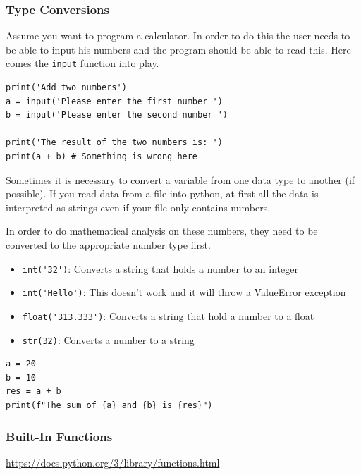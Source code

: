 \documentclass[10pt, a4paper]{beamer} %
\begin{document}
\begin{frame}
  \frametitle{Type Conversions}

  Assume you want to program a calculator.
  In order to do this the user needs to be able to input his numbers and the program should be able to read this.
  Here comes the \lstinline!input! function into play.

  \begin{lstlisting}
print('Add two numbers')
a = input('Please enter the first number ')
b = input('Please enter the second number ')

print('The result of the two numbers is: ')
print(a + b) # Something is wrong here
\end{lstlisting}


  \framebreak
  Sometimes it is necessary to convert a variable from one data type to another (if possible). If you
  read data from a file into python, at first all the data is interpreted as strings even if your file only
  contains numbers.

  In order to do mathematical analysis on these numbers, they need to be converted to the appropriate number type first.

  \begin{itemize}
    \item \lstinline!int('32')!: Converts a string that holds a number to an integer
    \item \lstinline!int('Hello')!: This doesn't work and it will throw a ValueError exception
    \item \lstinline!float('313.333')!: Converts a string that hold a number to a float
    \item \lstinline!str(32)!: Converts a number to a string
  \end{itemize}

  \begin{examples}
    \begin{lstlisting}
a = 20
b = 10
res = a + b
print(f"The sum of {a} and {b} is {res}")
\end{lstlisting}
  \end{examples}
\end{frame}

\begin{frame}[c]\frametitle{Built-In Functions}
  \url{https://docs.python.org/3/library/functions.html}
\end{frame}
\end{document}
